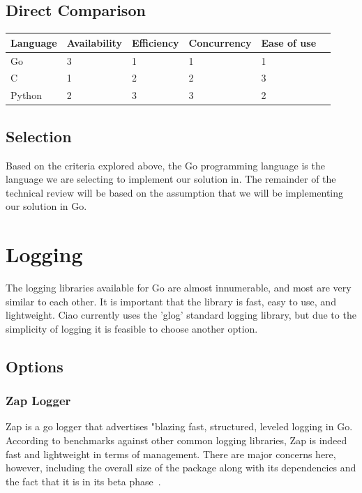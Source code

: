\documentclass[10pt,letterpaper,onecolumn,draftclsnofoot]{IEEEtran}
\begin{document}
\subsection{Direct Comparison}

\begin{center}
	\begin{tabular}{| l | l | l | l | l | l |}
		\hline
		Language & Availability & Efficiency & Concurrency & Ease of use
		\\ \hline
		Go     & 3 & 1 & 1 & 1 \\ \hline
		C      & 1 & 2 & 2 & 3 \\ \hline
		Python & 2 & 3 & 3 & 2 \\ \hline
	\end{tabular}
\end{center}

\subsection{Selection}

Based on the criteria explored above, the Go programming language is the
language we are selecting to implement our solution in. The remainder of the
technical review will be based on the assumption that we will be implementing
our solution in Go.

\section{Logging}

The logging libraries available for Go are almost innumerable, and most are very
similar to each other. It is important that the library is fast, easy to use,
and lightweight. Ciao currently uses the 'glog' standard logging library, but
due to the simplicity of logging it is feasible to choose another option.

\subsection{Options}

\subsubsection{Zap Logger}

Zap is a go logger that advertises "blazing fast, structured, leveled logging in
Go. According to benchmarks against other common logging libraries, Zap is
indeed fast and lightweight in terms of management. There are major concerns
here, however, including the overall size of the package along with its
dependencies and the fact that it is in its beta phase~\cite{zap}.
\end{document}
